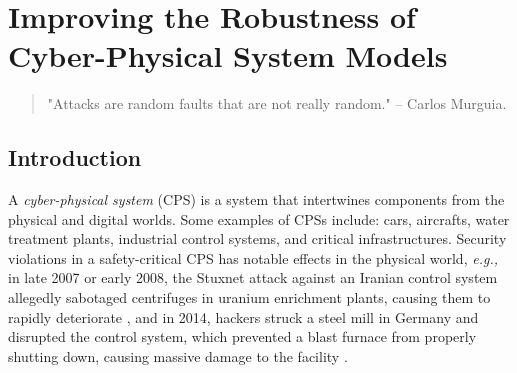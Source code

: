 \chapter{Improving the Robustness of Cyber-Physical System Models}
\label{ch:CPSRobustness}
\begin{quote}
    "Attacks are random faults that are not really random." -- Carlos Murguia.  
\end{quote}

\section{Introduction}
{\color{red}
A \emph{cyber-physical system} (CPS) is a system that intertwines components from the physical and digital worlds. Some examples of CPSs include: cars, aircrafts, water treatment plants, industrial control systems, and critical infrastructures. Security violations in a safety-critical CPS has notable effects in the physical world, \emph{e.g.,} in late 2007 or early 2008, the Stuxnet attack against an Iranian control system allegedly sabotaged centrifuges in uranium enrichment plants, causing them to rapidly deteriorate \cite{StuxnetWeb,Stuxnet}, and in 2014, hackers struck a steel mill in Germany and disrupted the control system, which prevented a blast furnace from properly shutting down, causing massive damage to the facility \cite{WiredArticle,Lagebericht2014}.
}
